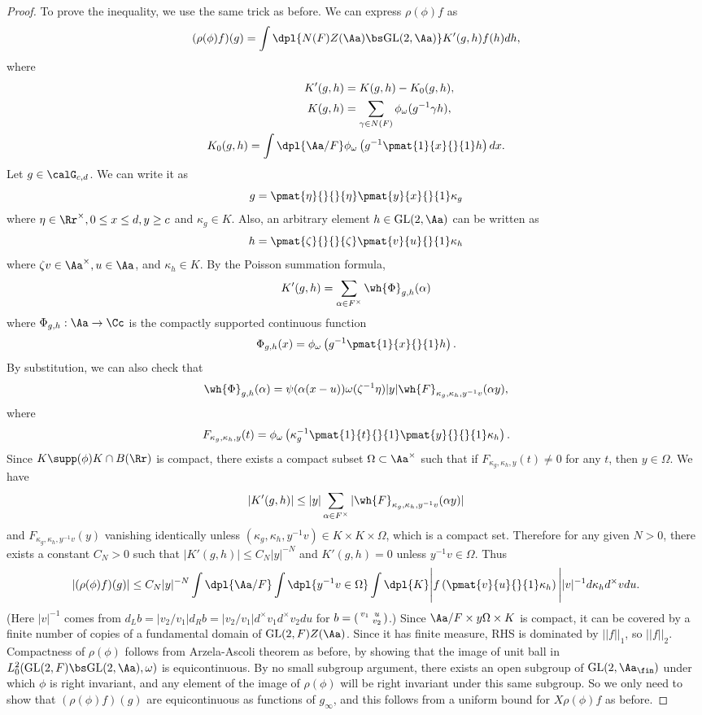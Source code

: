 \begin{proof}
To prove the inequality, we use the same trick as before. We can express $\rho(\phi)f$ as 
$$
(\rho(\phi)f)(g) = \int\dpl{N(F)Z(\Aa)\bs \GL(2, \Aa)} K'(g, h)f(h)dh, 
$$
where
\begin{align*}
K'(g, h) & = K(g, h) - K_{0}(g, h), \\
K(g, h) & = \sum_{\gamma \in N(F)} \phi_{\omega}(g^{-1}\gamma h), \\
K_{0}(g, h) = \int\dpl{\Aa/F} &\phi_{\omega} \left( g^{-1} \pmat{1}{x}{}{1} h\right)dx. 
\end{align*}
Let $g\in \calG_{c, d}$. We can write it as
$$
g = \pmat{\eta}{}{}{\eta} \pmat{y}{x}{}{1} \kappa_{g}
$$
where $\eta\in \Rr^{\times}, 0\leq x\leq d, y\geq c$ and $\kappa_{g} \in K$. 
Also, an arbitrary element $h\in \GL(2, \Aa)$ can be written as
$$
h = \pmat{\zeta}{}{}{\zeta}\pmat{v}{u}{}{1} \kappa_{h}
$$
where $\zeta v\in \Aa^{\times}, u\in \Aa$, and $\kappa_{h} \in K$. 
By the Poisson summation formula, 
$$
K'(g, h) = \sum_{\alpha\in F^{\times}} \wh{\Phi}_{g, h}(\alpha)
$$
where $\Phi_{g, h}:\Aa\to \Cc$ is the compactly supported continuous function 
$$
\Phi_{g, h}(x) =\phi_{\omega} \left( g^{-1} \pmat{1}{x}{}{1} h\right).
$$
By substitution, we can also check that
$$
\wh{\Phi}_{g, h}(\alpha) = \psi(\alpha(x-u))\omega(\zeta^{-1}\eta) |y|\wh{F}_{\kappa_{g}, \kappa_{h}, y^{-1}v}(\alpha y),
$$
where 
$$
F_{\kappa_{g}, \kappa_{h}, y}(t) = \phi_{\omega} \left( \kappa_{g}^{-1} \pmat{1}{t}{}{1} \pmat{y}{}{}{1} \kappa_{h}\right). 
$$
Since $K\supp(\phi)K \cap B(\Rr)$ is compact, there exists a compact subset $\Omega \subset \Aa^{\times}$ such that if $F_{\kappa_g, \kappa_h, y}(t) \neq 0$ for any $t$, then $y\in \Omega$. We have
$$
|K'(g, h)| \leq |y| \sum_{\alpha\in F^{\times}} |\wh{F}_{\kappa_g, \kappa_h, y^{-1}v}(\alpha y)| 
$$
and $F_{\kappa_g, \kappa_h, y^{-1}v}(y)$ vanishing identically unless $(\kappa_g, \kappa_h, y^{-1}v) \in K\times K\times \Omega$, which is a compact set. 
Therefore for any given $N>0$, there exists a constant $C_N > 0$ such that $|K'(g, h)| \leq C_N |y|^{-N}$ and $K'(g, h) = 0$ unless $y^{-1}v \in \Omega$. Thus
$$
|(\rho(\phi)f)(g)| \leq C_{N}|y|^{-N} \int\dpl{\Aa/F} \int\dpl{y^{-1}v\in \Omega}\int\dpl{K} \Bigg| f\left( \pmat{v}{u}{}{1} \kappa_{h}\right)\Bigg| |v|^{-1} d\kappa_{h}d^{\times}v du. 
$$
(Here $|v|^{-1}$ comes from $d_{L}b = |v_{2}/v_{1}| d_{R}b = |v_{2}/v_{1}|d^{\times}v_1 d^{\times}v_2 du$ for $b = \left(\begin{smallmatrix} v_1 & u \\  & v_2 \end{smallmatrix}\right)$.) 
Since $\Aa/F \times y\Omega \times K$ is compact, it can be covered by a finite number of copies of a fundamental domain of $\GL(2, F)Z(\Aa)$. Since it has finite measure, RHS is dominated by $||f||_{1}$, so $||f||_{2}$. 
Compactness of $\rho(\phi)$ follows from Arzela-Ascoli theorem as before, by showing that the image of unit ball in $L^{2}_{0}(\GL(2, F) \bs \GL(2, \Aa), \omega)$ is equicontinuous. 
By no small subgroup argument, there exists an open subgroup of $\GL(2, \Aa_{\fin})$ under which $\phi$ is right invariant, and any element of the image of $\rho(\phi)$ will be right invariant under this same subgroup. So we only need to show that $(\rho(\phi)f)(g)$ are equicontinuous as functions of $g_{\infty}$, and this follows from a uniform bound for $X\rho(\phi)f$ as before. 
\end{proof}

